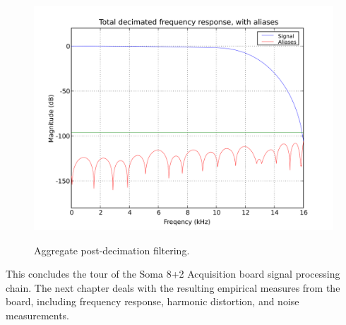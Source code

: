 \begin{figure}[h!]
  \includegraphics[scale=0.7]{soma-1.digital.withaliases.svg}
  \label{digital.withaliases}
  \caption{Aggregate post-decimation filtering.}
\end{figure}


This concludes the tour of the Soma 8+2 Acquisition board signal
processing chain. The next chapter deals with the resulting empirical
measures from the board, including frequency response, harmonic
distortion, and noise measurements.




